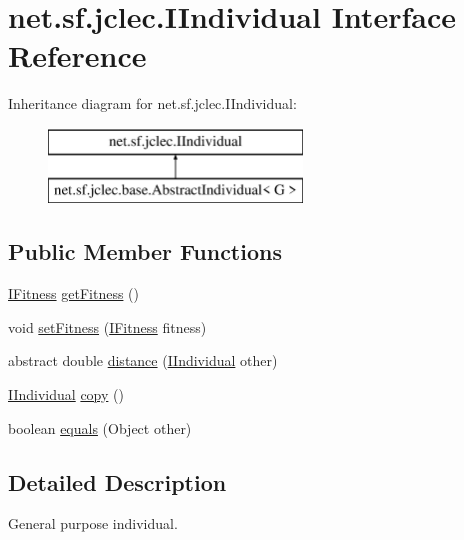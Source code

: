 \hypertarget{interfacenet_1_1sf_1_1jclec_1_1_i_individual}{\section{net.\-sf.\-jclec.\-I\-Individual Interface Reference}
\label{interfacenet_1_1sf_1_1jclec_1_1_i_individual}
}
Inheritance diagram for net.\-sf.\-jclec.\-I\-Individual\-:\begin{figure}[H]
\begin{center}
\leavevmode
\includegraphics[height=2.000000cm]{interfacenet_1_1sf_1_1jclec_1_1_i_individual}
\end{center}
\end{figure}
\subsection*{Public Member Functions}
\begin{DoxyCompactItemize}
\item 
\hyperlink{interfacenet_1_1sf_1_1jclec_1_1_i_fitness}{I\-Fitness} \hyperlink{interfacenet_1_1sf_1_1jclec_1_1_i_individual_af2c6e6204a66c02848e2cfe3780a7948}{get\-Fitness} ()
\item 
void \hyperlink{interfacenet_1_1sf_1_1jclec_1_1_i_individual_ad3e70e2475909eff7fcc29659cb65c0b}{set\-Fitness} (\hyperlink{interfacenet_1_1sf_1_1jclec_1_1_i_fitness}{I\-Fitness} fitness)
\item 
abstract double \hyperlink{interfacenet_1_1sf_1_1jclec_1_1_i_individual_af9377b8bdb99b3b7a620409e2231a840}{distance} (\hyperlink{interfacenet_1_1sf_1_1jclec_1_1_i_individual}{I\-Individual} other)
\item 
\hyperlink{interfacenet_1_1sf_1_1jclec_1_1_i_individual}{I\-Individual} \hyperlink{interfacenet_1_1sf_1_1jclec_1_1_i_individual_aa130350eac6b2e8f8d362d359f45437a}{copy} ()
\item 
boolean \hyperlink{interfacenet_1_1sf_1_1jclec_1_1_i_individual_adfbc76df9a2b0d8461e9146d4c7ec3d5}{equals} (Object other)
\end{DoxyCompactItemize}


\subsection{Detailed Description}
General purpose individual.


